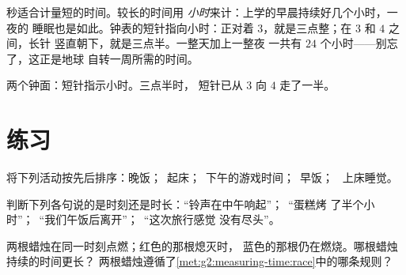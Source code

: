 \begin{example}[钟面上的时间]\label{ex:g2:measuring-time:clock}
秒适合计量短的时间。较长的时间用
\emph{小时}来计：上学的早晨持续好几个小时，一夜的
睡眠也是如此。钟表的短针指向小时：正对着
$3$，就是三点整；在 $3$ 和 $4$ 之间，长针
竖直朝下，就是三点半。一整天加上一整夜
一共有 $24$ 个小时——别忘了，这正是地球
自转一周所需的时间。
\end{example}

\begin{omfigure}

{\small 两个钟面：短针指示小时。三点半时，
短针已从 $3$ 向 $4$ 走了一半。}
\end{omfigure}

\section{练习}

\begin{exercise}[$\star$]\label{exo:g2:measuring-time:1}
将下列活动按先后排序：晚饭；\ 起床；\ 下午的游戏时间；\ 早饭；
\ 上床睡觉。
\end{exercise}

\begin{exercise}[$\star$]\label{exo:g2:measuring-time:2}
判断下列各句说的是时刻还是时长：“铃声在中午响起”；\ “蛋糕烤
了半个小时”；\ “我们午饭后离开”；\ “这次旅行感觉
没有尽头”。
\end{exercise}

\begin{exercise}[$\star$]\label{exo:g2:measuring-time:3}
两根蜡烛在同一时刻点燃；红色的那根熄灭时，
蓝色的那根仍在燃烧。哪根蜡烛持续的时间更长？
两根蜡烛遵循了\cref{met:g2:measuring-time:race}中的哪条规则？
\end{exercise}

